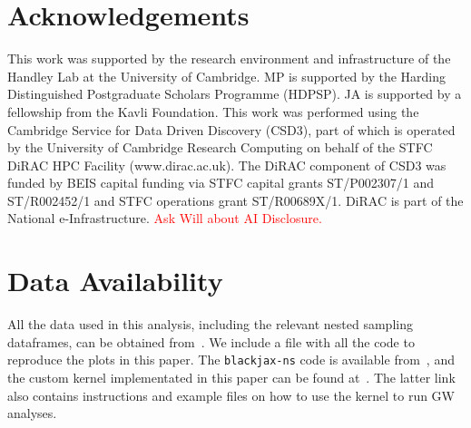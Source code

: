 \documentclass[fleqn,usenatbib]{mnras}
\begin{document}
\section*{Acknowledgements}

This work was supported by the research environment and infrastructure of the Handley Lab at the University of Cambridge.
MP is supported by the Harding Distinguished Postgraduate Scholars Programme (HDPSP). 
JA is supported by a fellowship from the Kavli Foundation.
This work was performed using the Cambridge Service for Data Driven Discovery (CSD3), 
part of which is operated by the University of Cambridge Research Computing on behalf of the
STFC DiRAC HPC Facility (www.dirac.ac.uk). The DiRAC component of CSD3 was funded by BEIS 
capital funding via STFC capital grants ST/P002307/1 and ST/R002452/1 and STFC operations 
grant ST/R00689X/1. DiRAC is part of the National e-Infrastructure.
\textcolor{red}{Ask Will about AI Disclosure.}

\section*{Data Availability}

 
All the data used in this analysis, including the relevant nested sampling dataframes, 
can be obtained from~\cite{Prathaban_2025_zenodo}. We include a file with all the 
code to reproduce the plots in this paper. The \texttt{blackjax-ns} code is available 
from~\cite{blackjax_ns_github}, and the custom kernel implementated in this paper can
be found at~\cite{Prathaban_2025_github}. The latter link also contains instructions and
example files on how to use the kernel to run GW analyses.








\end{document}
